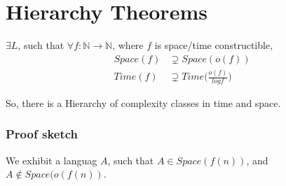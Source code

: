 \chapter{Hierarchy Theorems}

$\exists L$, such that $\forall f: \mathbb{N} \to \mathbb{N}$, where $f$ is
space/time constructible,
\begin{align*}
    Space(f) &\supsetneq Space(o(f)) \\
    Time(f) &\supsetneq Time \bigg (\frac{o(f)}{log f} \bigg )
\end{align*}

So, there is a Hierarchy of complexity classes in time and space.

\subsection{Proof sketch}
We exhibit a languag $A$, such that $A \in Space(f(n))$, and $A \notin Space(o(f(n))$.

